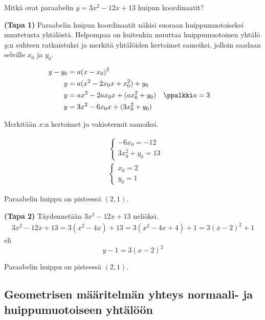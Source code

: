 \begin{esimerkki}
	Mitkä ovat paraabelin $y=3x^2-12x+13$ huipun koordinaatit?
	\begin{esimratk} \textbf{(Tapa 1)}
		Paraabelin huipun koordinaatit näkisi suoraan huippumuotoiseksi muutetusta yhtälöstä. Helpompaa on kuitenkin muuttaa huippumuotoinen yhtälö $y$:n suhteen ratkaistuksi ja merkitä yhtälöiden kertoimet samoiksi, jolloin saadaan selville $x_0$ ja $y_0$.

		\begin{align*}
			y-y_0	&= a(x-x_0)^2 \\
			y       &= a(x^2-2x_0x+x_0^2)+y_0\\
			y       &= ax^2-2ax_0x+(ax_0^2+y_0) &&\ppalkki a=3\\
			y       &= 3x^2-6x_0x+(3x_0^2+y_0)
		\end{align*}

		Merkitään $x$:n kertoimet ja vakiotermit samoiksi.

		\begin{align*}
			&\begin{cases}
				-6x_0=-12 \\
				3x_0^2+y_0 =13
			\end{cases}\\
			&\begin{cases}
				x_0=2 \\
				y_0 =1
			\end{cases}
		\end{align*}
		\begin{esimvast}
			Paraabelin huippu on pisteessä $(2, 1)$.
		\end{esimvast}

		\begin{esimratk} \textbf{(Tapa 2)}
			Täydennetään $3x^2-12x+13$ neliöksi.
			\begin{align*}
				3x^2-12x+13 = 3(x^2-4x)+13 = 3(x^2-4x+4)+1 = 3(x-2)^2+1
			\end{align*}
			eli
			\[ y-1 = 3(x-2)^2 \]
			\begin{esimvast}
			Paraabelin huippu on pisteessä $(2, 1)$.
\end{esimvast}
\end{esimratk}

\end{esimratk}
\end{esimerkki}

\subsection*{Geometrisen määritelmän yhteys normaali- ja huippumuotoiseen yhtälöön}

